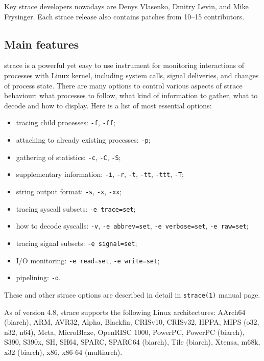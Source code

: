\documentclass[10pt, a5paper]{article}
\def\vv!#1!{\texttt{#1}}
\begin{document}
Key strace developers nowadays are Denys Vlasenko, Dmitry Levin, and Mike Frysinger. Each strace release also contains patches from 10--15 contributors.

\subsection*{Main features}

strace is a powerful yet easy to use instrument for monitoring \linebreak interactions of processes with Linux kernel, including system calls, signal deliveries, and changes of process state.  There are many options to control various aspects of strace behaviour: what processes to follow, what kind of information to gather, what to decode and how to display.  Here is a list of most essential options:

\begin{itemize}
  \item tracing child processes: \vv!-f!, \vv!-ff!;
  \item attaching to already existing processes: \vv!-p!;
  \item gathering of statistics: \vv!-c!, \vv!-C!, \vv!-S!;
  \item supplementary information: \vv!-i!, \vv!-r!, \vv!-t!, \vv!-tt!, \vv!-ttt!, \vv!-T!;
  \item string output format: \vv!-s!, \vv!-x!, \vv!-xx!;
  \item tracing syscall subsets: \vv!-e trace=set!;
  \item how to decode syscalls: \vv!-v!, \vv!-e abbrev=set!, \vv!-e verbose=set!, \vv!-e raw=set!;
  \item tracing signal subsets: \vv!-e signal=set!;
  \item I/O monitoring: \vv!-e read=set!, \vv!-e write=set!;
  \item pipelining: \vv!-o!.
\end{itemize}

These and other strace options are described in detail in \vv!strace(1)! manual page.

As of version 4.8, strace supports the following Linux architectures: AArch64 (biarch), ARM, AVR32, Alpha, Blackfin, CRISv10, CRISv32, HPPA, MIPS (o32, n32, n64), Meta, MicroBlaze, OpenRISC 1000, PowerPC, PowerPC (biarch), S390, S390x, SH, SH64, SPARC, \linebreak SPARC64 (biarch), Tile (biarch), Xtensa, m68k, x32 (biarch), x86, x86-64 (multiarch).
\end{document}
